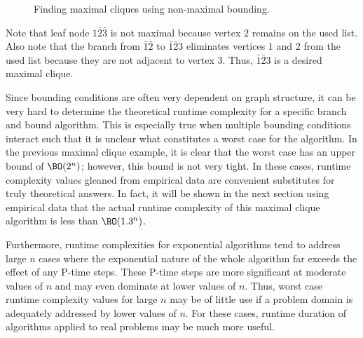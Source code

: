 \begin{figure}[H]
  \centering
  \caption{Finding maximal cliques using non-maximal bounding.}
  \label{fig:boundnonmax}
\end{figure}

Note that leaf node \(1\bar{2}\bar{3}\) is not maximal because vertex \(2\) remains on the used list.  Also note
that the branch from \(\bar{1}\bar{2}\) to \(\bar{1}\bar{2}3\) eliminates vertices \(1\) and \(2\) from the used
list because they are not adjacent to vertex \(3\).  Thus, \(\bar{1}\bar{2}3\) is a desired maximal clique.

Since bounding conditions are often very dependent on graph structure, it can be very hard to determine the
theoretical runtime complexity for a specific branch and bound algorithm.  This is especially true when multiple
bounding conditions interact such that it is unclear what constitutes a worst case for the algorithm.  In the
previous maximal clique example, it is clear that the worst case has an upper bound of \(\BO(2^n)\); however, this
bound is not very tight.  In these cases, runtime complexity values gleaned from empirical data are convenient
substitutes for truly theoretical answers.  In fact, it will be shown in the next section using empirical data that
the actual runtime complexity of this maximal clique algorithm is less than \(\BO(1.3^n)\).

Furthermore, runtime complexities for exponential algorithms tend to address large \(n\) cases where the
exponential nature of the whole algorithm far exceeds the effect of any P-time steps.  These P-time steps are more
significant at moderate values of \(n\) and may even dominate at lower values of \(n\).  Thus, worst case runtime
complexity values for large \(n\) may be of little use if a problem domain is adequately addressed by lower values
of \(n\).  For these cases, runtime duration of algorithms applied to real problems may be much more useful.
